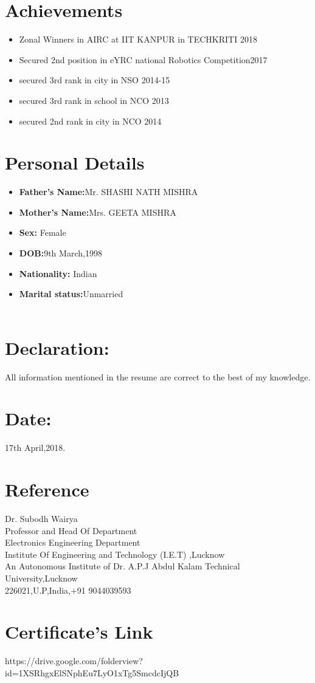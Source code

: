 \documentclass[11pt]{article}
\begin{document}
\section{Achievements}
\begin{itemize}
\item Zonal Winners in AIRC at IIT KANPUR in TECHKRITI 2018
\item Secured 2nd position in eYRC national Robotics Competition2017
\item secured 3rd rank in city in NSO 2014-15
\item secured 3rd rank in school in NCO 2013
\item secured 2nd rank in city in NCO  2014
\end{itemize}
\section{Personal Details}
\begin{itemize}
\item \textbf{Father's Name:}Mr. SHASHI NATH MISHRA
\item \textbf{Mother's Name:}Mrs. GEETA MISHRA
\newpage
\item \textbf{Sex:} Female
\item\textbf{ DOB:}9th March,1998
\item \textbf{Nationality:} Indian
\item \textbf{Marital status:}Unmarried      \\
\\
\newpage

\end{itemize}
\section{Declaration:}All information mentioned in the resume are correct to the best of my knowledge.\\

\section{Date:}17th April,2018.


\section{Reference}
\begin{flushleft}
Dr. Subodh Wairya \\
Professor and Head Of Department \\
Electronics Engineering Department \\
Institute Of Engineering and Technology (I.E.T) ,Lucknow \\
An Autonomous Institute of Dr. A.P.J Abdul Kalam Technical University,Lucknow \\
226021,U.P,India,+91 9044039593
\end{flushleft}
\section{Certificate's Link}
https://drive.google.com/folderview?id=1XSRhgxElSNphEu7LyO1xTg5SmcdcIjQB
\end{document}
